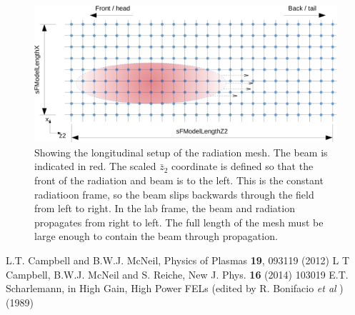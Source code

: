 \documentclass[12pt]{article}%
\begin{document}
\begin{figure}
\centering
\includegraphics[width=150mm]{long_mesh.png}
\caption{Showing the longitudinal setup of the radiation mesh. The beam is indicated in red. The scaled $\bar{z}_2$ coordinate is defined so that the front of the radiation and beam is to the left. This is the constant radiatioon frame, so the beam slips backwards through the field from left to right. In the lab frame, the beam and radiation propagates from right to left. The full length of the mesh must be large enough to contain the beam through propagation.}
\label{lgmsh}
\end{figure}









\begin{thebibliography}{10}

L.T. Campbell and B.W.J. McNeil, Physics of Plasmas {\bf 19}, 093119 (2012)
L T Campbell, B.W.J. McNeil and S. Reiche, New J. Phys. {\bf 16} (2014) 103019
E.T. Scharlemann, in High Gain, High Power FELs (edited by R. Bonifacio \textit{et al} ) (1989)

\end{thebibliography}
\end{document}
